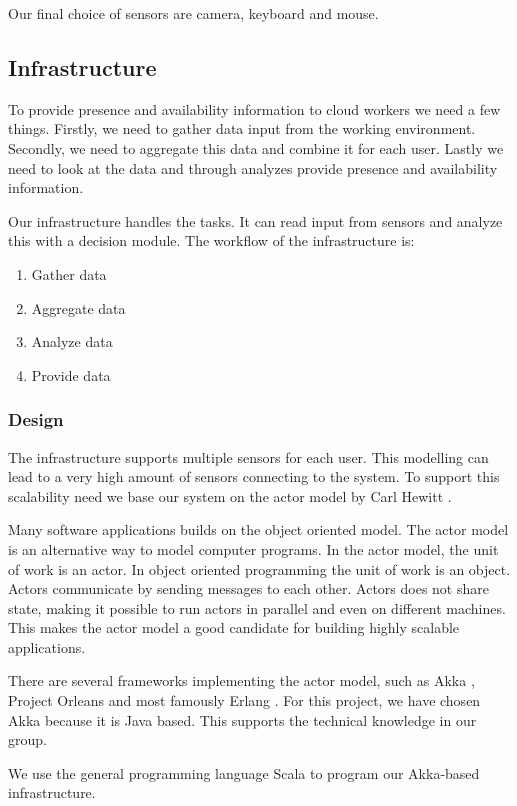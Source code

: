 \documentclass{sigchi}
\begin{document}
Our final choice of sensors are camera, keyboard and mouse.

\subsection{Infrastructure}
To provide presence and availability information to cloud workers we need a few things.
Firstly, we need to gather data input from the working environment.
Secondly, we need to aggregate this data and combine it for each user. Lastly we need to look at the data and through analyzes provide presence and availability information.

Our infrastructure handles the tasks. It can read input from sensors and analyze this with a decision module.
The workflow of the infrastructure is:

\begin{enumerate}
  \item Gather data
  \item Aggregate data
  \item Analyze data
  \item Provide data
\end{enumerate}

\subsubsection{Design}
The infrastructure supports multiple sensors for each user.
This modelling can lead to a very high amount of sensors connecting to the system.
To support this scalability need we base our system on the actor model by Carl Hewitt \cite{hewitt1973universal}.

Many software applications builds on the object oriented model.
The actor model is an alternative way to model computer programs.
In the actor model, the unit of work is an actor.
In object oriented programming the unit of work is an object.
Actors communicate by sending messages to each other.
Actors does not share state, making it possible to run actors in parallel and even on different machines.
This makes the actor model a good candidate for building highly scalable applications.

There are several frameworks implementing the actor model, such as Akka \cite{akka}, Project Orleans \cite{orleans} and most famously Erlang \cite{erlang}.
For this project, we have chosen Akka because it is Java based.
This supports the technical knowledge in our group.

We use the general programming language Scala \cite{scala} to program our Akka-based infrastructure.
\end{document}
